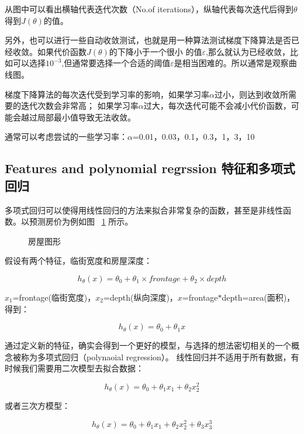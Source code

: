 \documentclass[UTF8]{ctexart}
\begin{document}
从图中可以看出横轴代表迭代次数（No.of iterations），纵轴代表每次迭代后得到$\theta$得到$J(\theta)$的值。

 另外，也可以进行一些自动收敛测试，也就是用一种算法测试梯度下降算法是否已经收敛。如果代价函数$J(\theta)$的下降小于一个很小
的值$\varepsilon$,那么就认为已经收敛，比如可以选择$10^{-3}$,但通常要选择一个合适的阈值$\varepsilon$是相当困难的。所以通常是观察曲线图。

梯度下降算法的每次迭代受到学习率的影响，如果学习率$\alpha$过小，则达到收敛所需要的迭代次数会非常高；
如果学习率$\alpha$过大，每次迭代可能不会减小代价函数，可能会越过局部最小值导致无法收敛。

通常可以考虑尝试的一些学习率：$\alpha$=0.01，0.03，0.1，0.3，1，3，10

\subsection{Features and polynomial regrssion 特征和多项式回归}
多项式回归可以使得用线性回归的方法来拟合非常复杂的函数，甚至是非线性函数。以预测房价为例如图 ~\ref{fig:4} 所示。
\begin{figure}[htb]
 \caption{房屋图形}
 \label{fig:4}
 \end{figure}

假设有两个特征，临街宽度和房屋深度：

\begin{equation*}
h_\theta(x)=\theta_0+\theta_1 \times frontage+\theta_2 \times depth
\end{equation*}

$x_1$=frontage(临街宽度)，$x_2$=depth(纵向深度)，$x$=frontage$\ast$depth=area(面积)，得到：

\begin{equation*}
h_\theta(x)=\theta_0+\theta_1x
\end{equation*}

通过定义新的特征，确实会得到一个更好的模型，与选择的想法密切相关的一个概念被称为多项式回归（polynaoial regression）。
线性回归并不适用于所有数据，有时候我们需要用二次模型去拟合数据：

\begin{equation*}
h_\theta(x)=\theta_0+\theta_1x_1+\theta_2x_2^{2}
\end{equation*}

或者三次方模型：

\begin{equation*}
h_\theta(x)=\theta_0+\theta_1x_1+\theta_2x_2^{2}+\theta_3x_3^{3}
\end{equation*}
\end{document}

